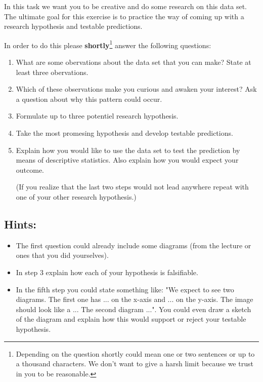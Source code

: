 \documentclass{WeSTassignment}
\begin{document}
In this task we want you to be creative and do some research on this data set. The ultimate goal for this exercise is to practice the way of coming up with a research hypothesis and testable predictions. 

In order to do this please \textbf{shortly}\footnote{Depending on the question shortly could mean one or two sentences or up to a thousand characters. We don't want to give a harsh limit because we trust in you to be reasonable.} answer the following questions: 

\begin{enumerate}
\item What are some obervations about the data set that you can make? State at least three obervations.
\item Which of these observations make you curious and awaken your interest? Ask a question about why this pattern could occur.
\item Formulate up to three potentiel research hypothesis.
\item Take the most promesing hypothesis and develop testable predictions.
\item Explain how you would like to use the data set to test the prediction by means of descriptive statistics. Also explain how you would expect your outcome. 

(If you realize that the last two steps would not lead anywhere repeat with one of your other research hypothesis.)
\end{enumerate}

\subsection{Hints:}
\begin{itemize}
\item The first question could already include some diagrams (from the lecture or ones that you did yourselves).
\item In step 3 explain how each of your hypothesis is falsifiable. 
\item In the fifth step you could state something like: "We expect to see two diagrams. The first one has ... on the x-axis and ... on the y-axis. The image should look like a ... The second diagram ...". You could even draw a sketch of the diagram and explain how this would support or reject your testable hypothesis. 
\end{itemize}
\end{document}
